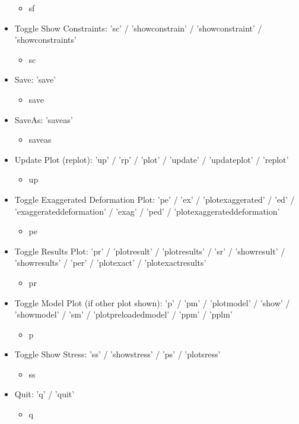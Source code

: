 \documentclass[11pt, oneside]{article}   	%
\begin{document}
\begin{itemize}
	\begin{itemize}
		\item sf
	\end{itemize}
\item{Toggle Show Constraints: 'sc' / 'showconstrain' / 'showconstraint' / 'showconstraints'}
	\begin{itemize}
		\item sc
	\end{itemize}
\item{Save: 'save'}
	\begin{itemize}
		\item save
	\end{itemize}
\item{SaveAs: 'saveas'}
	\begin{itemize}
		\item saveas
	\end{itemize}
\item{Update Plot (replot): 'up' / 'rp' / 'plot' / 'update' / 'updateplot' / 'replot'}
	\begin{itemize}
		\item up
	\end{itemize}
\item{Toggle Exaggerated Deformation Plot: 'pe' / 'ex' / 'plotexaggerated' / 'ed' / 'exaggerateddeformation' / 'exag' / 'ped' / 'plotexaggerateddeformation'}
	\begin{itemize}
		\item pe
	\end{itemize}
\item{Toggle Results Plot: 'pr' / 'plotresult' / 'plotresults' / 'sr' / 'showresult' / 'showresults' / 'per' / 'plotexact' / 'plotexactresults'}
	\begin{itemize}
		\item pr
	\end{itemize}
\item{Toggle Model Plot (if other plot shown): 'p' / 'pm' / 'plotmodel' / 'show' / 'showmodel' / 'sm' / 'plotpreloadedmodel' / 'ppm' / 'pplm'}
	\begin{itemize}
		\item p
	\end{itemize}
\item{Toggle Show Stress: 'ss' / 'showstress' / 'ps' / 'plotsress'}
	\begin{itemize}
		\item ss
	\end{itemize}
\item{Quit: 'q' / 'quit'}
	\begin{itemize}
		\item q
	\end{itemize}
\end{itemize}
\end{document}
